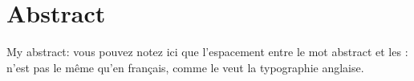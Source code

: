 % 
% 
 \renewcommand{\abstractname}{Abstract}%
 
 \chapter*{Abstract}
 My abstract: vous pouvez notez ici que l'espacement entre le mot abstract et les : n'est pas le même qu'en français, comme le veut la typographie anglaise.

% 
